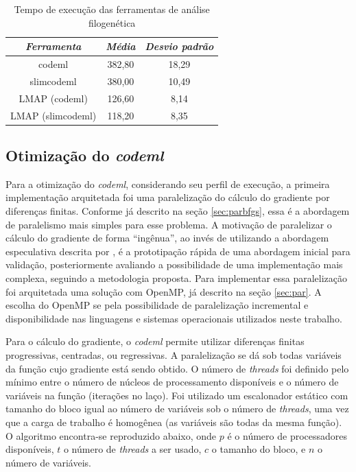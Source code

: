 \documentclass[cic,tc]{iiufrgs}
\begin{document}
\begin{table}[h]
    \caption{Tempo de execução das ferramentas de análise filogenética}
    \centering
        \begin{tabular}{c|c|c}
          \hline
          \textit{Ferramenta} & \textit{Média} & \textit{Desvio padrão} \\
          \hline
          \hline
          codeml            & 382,80 & 18,29 \\
          slimcodeml        & 380,00 & 10,49 \\
          LMAP (codeml)     & 126,60 & 8,14 \\
          LMAP (slimcodeml) & 118,20 & 8,35  \\
          \hline
        \end{tabular}
    \label{tbl:paml}
\end{table}

\subsection{Otimização do \textit{codeml}}
\label{sec:optcodeml}

Para a otimização do \textit{codeml}, considerando seu perfil de execução, a
primeira implementação arquitetada foi uma paralelização do cálculo do
gradiente por diferenças finitas. Conforme já descrito na seção
\ref{sec:parbfgs}, essa é a abordagem de paralelismo mais simples para esse
problema. A motivação de paralelizar o cálculo do gradiente de forma
``ingênua'', ao invés de utilizando a abordagem especulativa descrita por
\cite{byrd1988parallel}, é a prototipação rápida de uma abordagem inicial para
validação, posteriormente avaliando a possibilidade de uma implementação mais
complexa, seguindo a metodologia proposta. Para implementar essa paralelização
foi arquitetada uma solução com OpenMP, já descrito na seção \ref{sec:par}. A
escolha do OpenMP se pela possibilidade de paralelização incremental e
disponibilidade nas linguagens e sistemas operacionais utilizados neste
trabalho.

Para o cálculo do gradiente, o \textit{codeml} permite utilizar diferenças finitas
progressivas, centradas, ou regressivas. A paralelização se dá sob todas
variáveis da função cujo gradiente está sendo obtido. O número de
\textit{threads} foi definido pelo mínimo entre o número de núcleos de
processamento disponíveis e o número de variáveis na função (iterações no
laço). Foi utilizado um escalonador estático com tamanho do bloco igual ao
número de variáveis sob o número de \textit{threads}, uma vez que a carga de
trabalho é homogênea (as variáveis são todas da mesma função). O algoritmo
encontra-se reproduzido abaixo, onde $p$ é o número de processadores
disponíveis, $t$ o número de \textit{threads} a ser usado, $c$ o tamanho do
bloco, e $n$ o número de variáveis.
\end{document}
